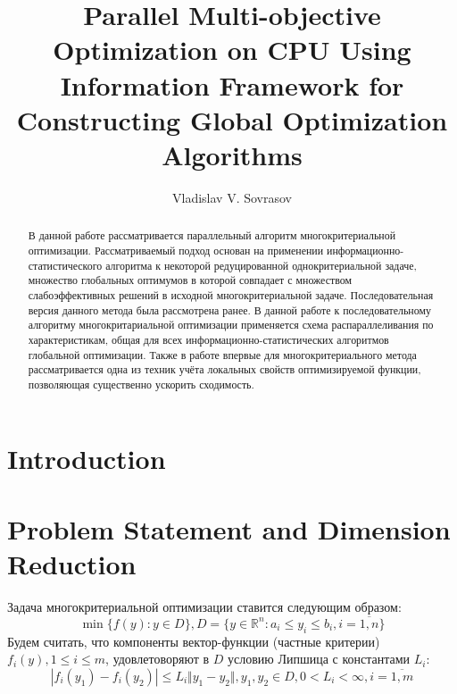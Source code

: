 \documentclass{llncs}
\begin{document}
%
\mainmatter              %
%
\title{Parallel Multi-objective Optimization on CPU Using Information Framework for Constructing Global Optimization Algorithms}
%
%
\author{Vladislav V. Sovrasov}
%
%
%

\maketitle              %

\begin{abstract}
В данной работе рассматривается параллельный алгоритм многокритериальной оптимизации. Рассматриваемый подход основан на применении информационно-статистического алгоритма к некоторой редуцированной однокритериальной задаче, множество глобальных оптимумов в которой совпадает с множеством слабоэффективных решений в исходной многокритериальной задаче. Последовательная версия данного метода была рассмотрена ранее. В данной работе к последовательному алгоритму многокритариальной оптимизации применяется схема распараллеливания по характеристикам, общая для всех информационно-статистических алгоритмов глобальной оптимизации. Также в работе впервые для многокритериального метода рассматривается одна из техник учёта локальных свойств оптимизируемой функции, позволяющая существенно ускорить сходимость.

\end{abstract}
%
\section{Introduction}
\section{Problem Statement and Dimension Reduction}
Задача многокритериальной оптимизации ставится следующим образом:
\begin{equation}
  \label{eq:problem}
  \min\{f(y): y\in D\}, D=\{y\in \mathbb{R}^n: a_i \leqslant y_i \leqslant b_i, i=\overline{1,n} \}
\end{equation}
Будем считать, что компоненты вектор-функции (частные критерии) \(f_i(y), 1\leqslant i\leqslant m\), удовлетоворяют в \(D\) условию Липшица с константами \(L_i\):
\begin{displaymath}
\label{lip}
|f_i(y_1)-f_i(y_2)|\leqslant L_i\Vert y_1-y_2\Vert,y_1,y_2\in D,0<L_i<\infty,i=\overline{1,m}
\end{displaymath}
\end{document}
